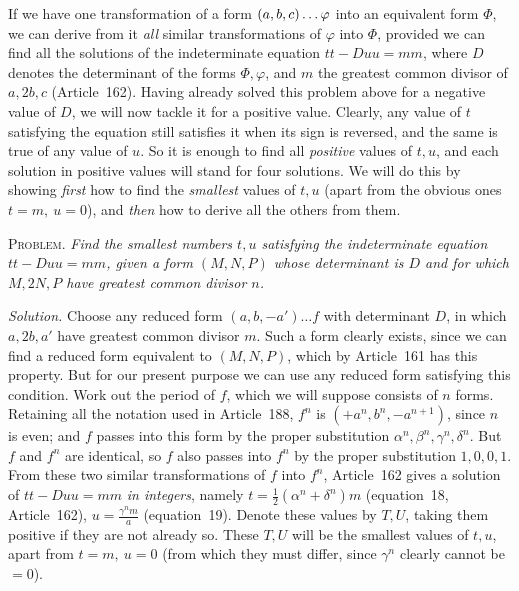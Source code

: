 If we have one transformation of a form $(a,b,c)\mathinner{\ldotp\ldotp\ldotp}\varphi$ into an equivalent form $\Phi$, we can derive from it \textit{all} similar transformations of $\varphi$ into $\Phi$, provided we can find all the solutions of the indeterminate equation $tt-Duu=mm$,
where \(D\) denotes the determinant of the forms \(\Phi,\varphi\), and \(m\) the greatest common divisor of \(a,2b,c\) (Article~162). Having already solved this problem above for a negative value of \(D\), we will now tackle it for a positive value. Clearly, any value of \(t\) satisfying the equation still satisfies it when its sign is reversed, and the same is true of any value of \(u\). So it is enough to find all \textit{positive} values of \(t,u\), and each solution in positive values will stand for four solutions. We will do this by showing \textit{first} how to find the \textit{smallest} values of \(t,u\) (apart from the obvious ones \(t=m,\ u=0\)), and \textit{then} how to derive all the others from them.

\textsc{Problem.} \textit{Find the smallest numbers \(t,u\) satisfying the indeterminate equation \(tt-Duu=mm\), given a form \((M,N,P)\) whose determinant is \(D\) and for which \(M,2N,P\) have greatest common divisor \(n\).}

\textit{Solution.} Choose any reduced form \((a,b,-a')\ldots f\) with determinant \(D\), in which \(a,2b,a'\) have greatest common divisor \(m\). Such a form clearly exists, since we can find a reduced form equivalent to \((M,N,P)\), which by Article~161 has this property. But for our present purpose we can use any reduced form satisfying this condition. Work out the period of \(f\), which we will suppose consists of \(n\) forms. Retaining all the notation used in Article~188, \(f^n\) is \((+a^n,b^n,-a^{n+1})\), since \(n\) is even; and \(f\) passes into this form by the proper substitution \(\alpha^n,\beta^n,\gamma^n,\delta^n\). But \(f\) and \(f^n\) are identical, so \(f\) also passes into \(f^n\) by the proper substitution \(1,0,0,1\). From these two similar transformations of \(f\) into \(f^n\), Article~162 gives a solution of \(tt-Duu=mm\) \textit{in integers}, namely \(t=\frac12(\alpha^n+\delta^n)m\) (equation~18, Article~162), \(u=\frac{\gamma^n m}{a}\) (equation~19). Denote these values by \(T,U\), taking them positive if they are not already so. These \(T,U\) will be the smallest values of \(t,u\), apart from \(t=m,\ u=0\) (from which they must differ, since \(\gamma^n\) clearly cannot be \(=0\)).

